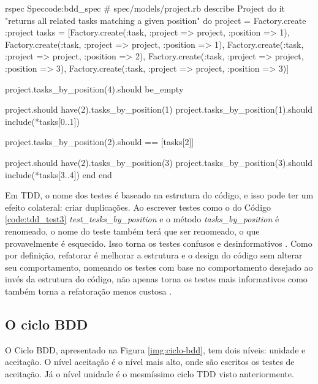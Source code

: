 \begin{mycode}{rspec}%
{Spec}{code:bdd_spec}
# spec/models/project.rb
describe Project do
  it "returns all related tasks matching a given position" do
    project = Factory.create :project
    tasks = [Factory.create(:task, :project => project, :position => 1),
             Factory.create(:task, :project => project, :position => 1),
             Factory.create(:task, :project => project, :position => 2),
             Factory.create(:task, :project => project, :position => 3),
             Factory.create(:task, :project => project, :position => 3)]

    project.tasks_by_position(4).should be_empty

    project.should have(2).tasks_by_position(1)
    project.tasks_by_position(1).should include(*tasks[0..1])

    project.tasks_by_position(2).should == [tasks[2]]

    project.should have(2).tasks_by_position(3)
    project.tasks_by_position(3).should include(*tasks[3..4])
  end
end
\end{mycode}

Em TDD, o nome dos testes é baseado na estrutura do código, e isso pode ter um efeito colateral: criar duplicações. Ao escrever testes como o do Código \ref{code:tdd_test3} \textit{test\_tesks\_by\_position} e o método \textit{tasks\_by\_position} é renomeado, o nome do teste também terá que ser renomeado, o que provavelmente é esquecido. Isso torna os testes confusos e desinformativos \cite{ContinuousTesting}. Como por definição, refatorar é melhorar a estrutura e o design do código sem alterar seu comportamento, nomeando os testes com base no comportamento desejado ao invés da estrutura do código, não apenas torna os testes mais informativos como também torna a refatoração menos custosa \cite{ContinuousTesting}.


\subsection{O ciclo BDD}
\label{sub:o_ciclo_bdd}

O Ciclo BDD, apresentado na Figura \ref{img:ciclo-bdd}, tem dois níveis: unidade e aceitação. O nível aceitação é o nível mais alto, onde são escritos os testes de aceitação. Já o nível unidade é o mesmíssimo ciclo TDD visto anteriormente.

